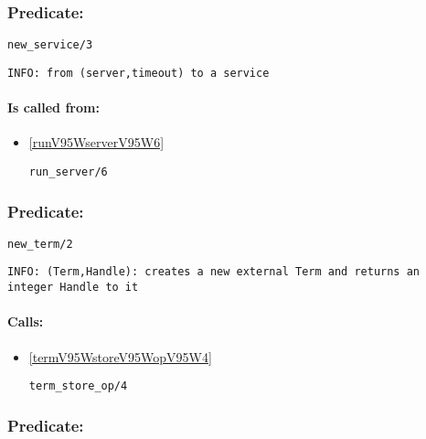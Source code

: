 \subsubsection{Predicate:} \label{newV95WserviceV95W3}

\begin{verbatim}
new_service/3
\end{verbatim}

{\small \begin{verbatim}
INFO: from (server,timeout) to a service

\end{verbatim}}
\paragraph{Is called from:} 
\begin{itemize}
\item \ref{runV95WserverV95W6} 
\begin{verbatim}
run_server/6
\end{verbatim}

\end{itemize}

\subsubsection{Predicate:} \label{newV95WtermV95W2}

\begin{verbatim}
new_term/2
\end{verbatim}

{\small \begin{verbatim}
INFO: (Term,Handle): creates a new external Term and returns an integer Handle to it

\end{verbatim}}
\paragraph{Calls:} 
\begin{itemize}
\item \ref{termV95WstoreV95WopV95W4} 
\begin{verbatim}
term_store_op/4
\end{verbatim}

\end{itemize}

\subsubsection{Predicate:} \label{newV95WthreadV95WguardV95W1}

